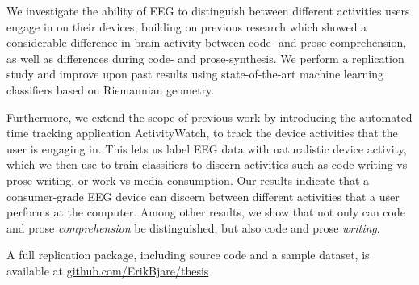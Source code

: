 We investigate the ability of EEG to distinguish between different activities users engage in on their devices, building on previous research which showed a considerable difference in brain activity between code- and prose-comprehension, as well as differences during code- and prose-synthesis. We perform a replication study and improve upon past results using state-of-the-art machine learning classifiers based on Riemannian geometry.

Furthermore, we extend the scope of previous work by introducing the automated time tracking application ActivityWatch, to track the device activities that the user is engaging in. This lets us label EEG data with naturalistic device activity, which we then use to train classifiers to discern activities such as code writing vs prose writing, or work vs media consumption. Our results indicate that a consumer-grade EEG device can discern between different activities that a user performs at the computer. Among other results, we show that not only can code and prose \emph{comprehension} be distinguished, but also code and prose \emph{writing}.





A full replication package, including source code and a sample dataset, is available at \href{https://github.com/ErikBjare/thesis}{github.com/ErikBjare/thesis}
